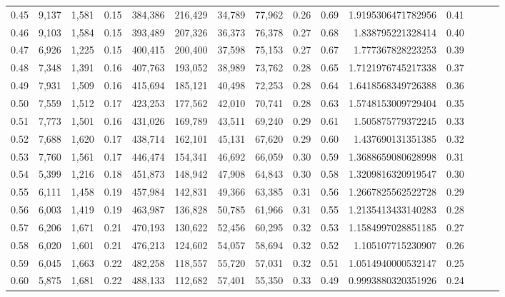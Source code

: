 \begin{tabular}{rrrrrrrrrrrrrrr}
0.45 &   9,137 &  1,581 &  0.15 &  384,386 &  216,429 &   34,789 &   77,962 &  0.26 &  0.69 &   1.9195306471782956 &      0.41 \\
0.46 &   9,103 &  1,584 &  0.15 &  393,489 &  207,326 &   36,373 &   76,378 &  0.27 &  0.68 &    1.838795221328414 &      0.40 \\
0.47 &   6,926 &  1,225 &  0.15 &  400,415 &  200,400 &   37,598 &   75,153 &  0.27 &  0.67 &    1.777367828223253 &      0.39 \\
0.48 &   7,348 &  1,391 &  0.16 &  407,763 &  193,052 &   38,989 &   73,762 &  0.28 &  0.65 &   1.7121976745217338 &      0.37 \\
0.49 &   7,931 &  1,509 &  0.16 &  415,694 &  185,121 &   40,498 &   72,253 &  0.28 &  0.64 &   1.6418568349726388 &      0.36 \\
0.50 &   7,559 &  1,512 &  0.17 &  423,253 &  177,562 &   42,010 &   70,741 &  0.28 &  0.63 &   1.5748153009729404 &      0.35 \\
0.51 &   7,773 &  1,501 &  0.16 &  431,026 &  169,789 &   43,511 &   69,240 &  0.29 &  0.61 &    1.505875779372245 &      0.33 \\
0.52 &   7,688 &  1,620 &  0.17 &  438,714 &  162,101 &   45,131 &   67,620 &  0.29 &  0.60 &    1.437690131351385 &      0.32 \\
0.53 &   7,760 &  1,561 &  0.17 &  446,474 &  154,341 &   46,692 &   66,059 &  0.30 &  0.59 &   1.3688659080628998 &      0.31 \\
0.54 &   5,399 &  1,216 &  0.18 &  451,873 &  148,942 &   47,908 &   64,843 &  0.30 &  0.58 &   1.3209816320919547 &      0.30 \\
0.55 &   6,111 &  1,458 &  0.19 &  457,984 &  142,831 &   49,366 &   63,385 &  0.31 &  0.56 &   1.2667825562522728 &      0.29 \\
0.56 &   6,003 &  1,419 &  0.19 &  463,987 &  136,828 &   50,785 &   61,966 &  0.31 &  0.55 &   1.2135413433140283 &      0.28 \\
0.57 &   6,206 &  1,671 &  0.21 &  470,193 &  130,622 &   52,456 &   60,295 &  0.32 &  0.53 &   1.1584997028851185 &      0.27 \\
0.58 &   6,020 &  1,601 &  0.21 &  476,213 &  124,602 &   54,057 &   58,694 &  0.32 &  0.52 &    1.105107715230907 &      0.26 \\
0.59 &   6,045 &  1,663 &  0.22 &  482,258 &  118,557 &   55,720 &   57,031 &  0.32 &  0.51 &   1.0514940000532147 &      0.25 \\
0.60 &   5,875 &  1,681 &  0.22 &  488,133 &  112,682 &   57,401 &   55,350 &  0.33 &  0.49 &   0.9993880320351926 &      0.24 \\

\end{tabular}

